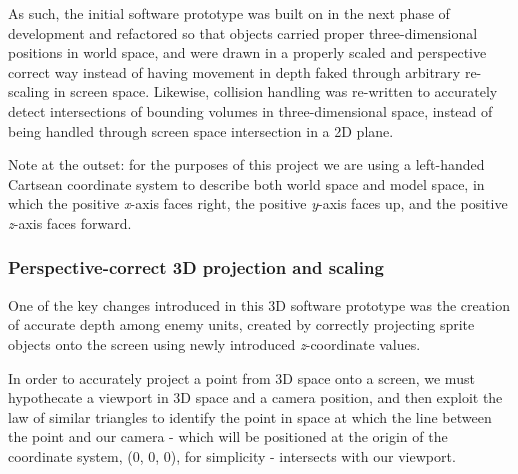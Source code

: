 \documentclass[11pt]{article}
\begin{document}
As such, the initial software prototype was built on in the next phase of development and refactored
so that objects carried proper three-dimensional positions in world space, and were drawn in a
properly scaled and perspective correct way instead of having movement in depth faked through
arbitrary re-scaling in screen space. Likewise, collision handling was re-written to accurately detect
intersections of bounding volumes in three-dimensional space, instead of being handled through
screen space intersection in a 2D plane.

Note at the outset: for the purposes of this project we are using a left-handed Cartsean coordinate
system to describe both world space and model space, in which the positive \textit{x}-axis faces right,
the positive \textit{y}-axis faces up, and the positive \textit{z}-axis faces forward.

\subsubsection*{Perspective-correct 3D projection and scaling}
One of the key changes introduced in this 3D software prototype was the creation of accurate
depth among enemy units, created by correctly projecting sprite objects onto the screen using
newly introduced \textit{z}-coordinate values.

In order to accurately project a point from 3D space onto a screen, we must hypothecate a viewport in 3D space
and a camera position, and then exploit the law of similar triangles to identify the point in space at
which the line between the point and our camera - which will be positioned at the origin of the
coordinate system, (0, 0, 0), for simplicity - intersects with our viewport.
\end{document}
